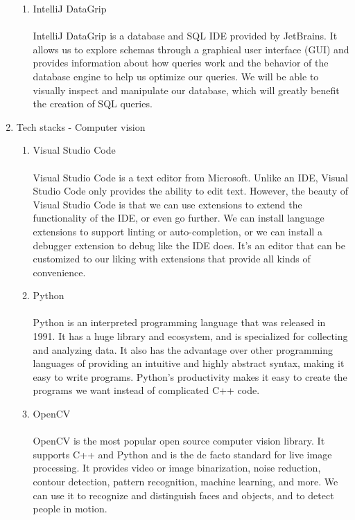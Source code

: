 \begin{enumerate}[label=\arabic*]
\begin{enumerate}[label=\alph*.]
            \item IntelliJ DataGrip\\
            \\
            IntelliJ DataGrip is a database and SQL IDE provided by JetBrains. It allows us to explore schemas through a graphical user interface (GUI) and provides information about how queries work and the behavior of the database engine to help us optimize our queries. We will be able to visually inspect and manipulate our database, which will greatly benefit the creation of SQL queries.\\
        \end{enumerate}

        \item {\large{Tech stacks - Computer vision}}
        \begin{enumerate}[label=\alph*.]
            \item Visual Studio Code\\
            \\
            Visual Studio Code is a text editor from Microsoft. Unlike an IDE, Visual Studio Code only provides the ability to edit text. However, the beauty of Visual Studio Code is that we can use extensions to extend the functionality of the IDE, or even go further. We can install language extensions to support linting or auto-completion, or we can install a debugger extension to debug like the IDE does. It's an editor that can be customized to our liking with extensions that provide all kinds of convenience.\\

            \item Python\\
            \\
            Python is an interpreted programming language that was released in 1991. It has a huge library and ecosystem, and is specialized for collecting and analyzing data. It also has the advantage over other programming languages of providing an intuitive and highly abstract syntax, making it easy to write programs. Python's productivity makes it easy to create the programs we want instead of complicated C++ code.\\

            \item OpenCV\\
            \\
            OpenCV is the most popular open source computer vision library. It supports C++ and Python and is the de facto standard for live image processing. It provides video or image binarization, noise reduction, contour detection, pattern recognition, machine learning, and more. We can use it to recognize and distinguish faces and objects, and to detect people in motion. \\


\end{enumerate}
\end{enumerate}
